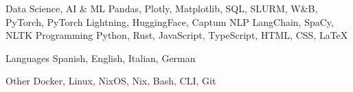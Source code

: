 

\begin{cvskills}


  \cvskill
    {Data Science, AI \& ML} %
    {Pandas, Plotly, Matplotlib, SQL, SLURM, W\&B, PyTorch, PyTorch Lightning, HuggingFace, Captum} %
  \cvskill
    {NLP} %
    {LangChain, SpaCy, NLTK} %
  \cvskill
    {Programming} %
    {Python, Rust, JavaScript, TypeScript, HTML, CSS, LaTeX} %

  \cvskill
    {Languages} %
    {Spanish, English, Italian, German} %

  \cvskill
    {Other}
    {Docker, Linux, NixOS, Nix, Bash, CLI, Git}

\end{cvskills}
